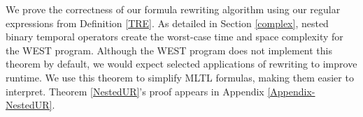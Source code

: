 \documentclass[runningheads]{llncs}
\renewcommand{\phi}{\varphi}
\begin{document}
  
  
 We prove the correctness of our formula rewriting algorithm using our regular expressions from Definition \ref{TRE}. As detailed in Section \ref{complex}, nested binary temporal operators create the worst-case time and space complexity for the WEST program. Although the WEST program does not implement this theorem by default, we would expect selected applications of rewriting to improve runtime. We use this theorem to simplify MLTL formulas, making them easier to interpret.
Theorem \ref{NestedUR}'s proof appears in Appendix \ref{Appendix-NestedUR}.
 
\end{document}

